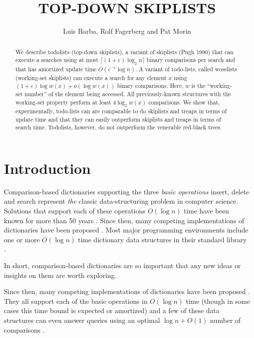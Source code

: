 \documentclass[lotsofwhite]{patmorin}
\title{\MakeUppercase{Top-Down Skiplists}}
\author{Luis Barba, Rolf Fagerberg and Pat Morin}
\newcommand{\eps}{\varepsilon}
\begin{document}
\begin{titlepage}
\maketitle

\begin{abstract}
  We describe todolists (top-down skiplists), a variant of skiplists (Pugh
  1990) that can execute a searches using at most $\lceil(1+\eps)\log_2
  n\rceil$ binary comparisons per search and that has amortized update
  time $O(\eps^{-1}\log n)$.  A variant of todo-lists, called woselists
  (working-set skiplists) can execute a search for any element $x$
  using $(1+\eps)\log w(x) + o(\log w(x))$ binary comparisons.  Here,
  $w$ is the ``working-set number'' of the element being accessed.
  All previously-known structures with the working-set property perform
  at least $4\log_2 w(x)$ comparisons.  We show that, experimentally,
  todo-lists can are comparable to do skiplists and treaps in terms of
  update time and that they can easily outperform skiplists and treaps
  in terms of search time.  Todolists, however, do not outperform the
  venerable red-black trees.
\end{abstract}

\end{titlepage}

\section{Introduction}

Comparison-based dictionaries supporting the three \emph{basic operations}
insert, delete and search represent \emph{the} classic data-structuring
problem in computer science.  Solutions that support each of these
operations $O(\log n)$ time have been known for more than 50 years
\cite{avl}.  Since then, many competing implementations of dictionaries
have been proposed \cite{X}.
  Most major programming environments include one or more
$O(\log n)$ time dictionary data structures in their standard library
\cite{S}.

In short, comparison-based dictionaries are so important that any new
ideas or insights on them are worth exploring.

Since then, many competing implementations of dictionaries
have been proposed \cite{X}.  They all support each of the basic
operations in $O(\log n)$ time (though in some cases this time bound is
expected or amortized) and a few of these data structures can even answer
queries using an optimal $\log n + O(1)$ number of comparisons \cite{X,Y}.
\end{document}
